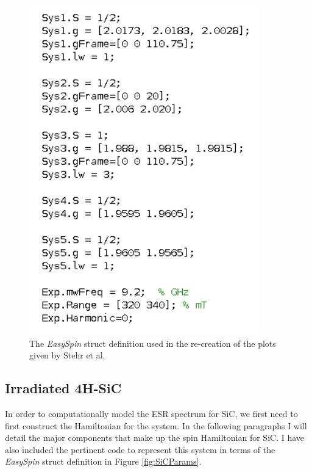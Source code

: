 \documentclass[oneside]{BYUPhys}
\begin{document}
\begin{figure}[h]
    \centerline{\includegraphics{stehr_code_fig}}
    \caption[The \textit{EasySpin} Representation of ZnO Nanowires]{\label{fig:StehrCode}
     The \textit{EasySpin} struct definition used in the re-creation of the plots given by Stehr et al.}
 \end{figure}

\subsection{Irradiated 4H-SiC}

In order to computationally model the ESR spectrum for SiC, we first need to first construct the Hamiltonian for the system. In the following paragraphs I will detail the major components that make up the spin Hamiltonian for SiC. I have also included the pertinent code to represent this system in terms of the \textit{EasySpin} struct definition in Figure \ref{fig:SiCParams}.
\end{document}
